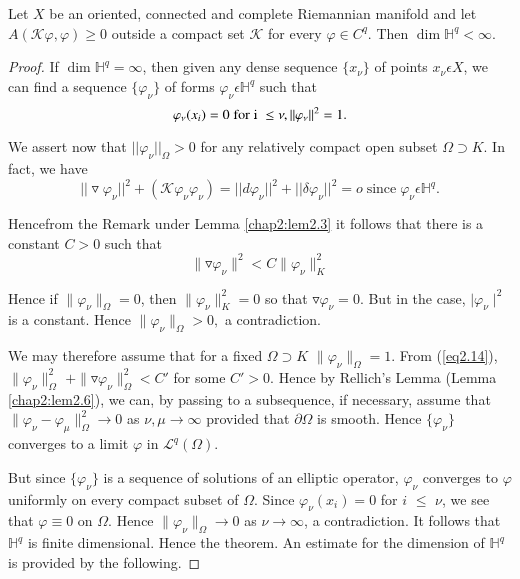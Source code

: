 \begin{theorem}\label{chap2:thm2.5}%
  Let $X$ be an oriented, connected and complete Riemannian manifold
  and let $A(\mathcal{K}\varphi,\varphi)\geq 0$ outside a compact set
  $\mathcal{K}$ for every $\varphi \in  C^q$. Then $\dim \mathbb{H}^q<\infty$. 
\end{theorem}

\begin{proof}
  If $\dim \mathbb{H}^q=\infty$, then given any dense sequence
  $\{x_\nu\}$ of points $x_\nu \epsilon X$, we can find a sequence
  $\{\varphi_\nu \}$ of forms $\varphi_\nu \epsilon \mathbb{H}^q$  
  such that 
  $$
  \varphi_\nu(x_i)=0 \; {\rm for \; i}\;\leq \nu ,
  ||\varphi_\nu||^2 = 1. 
  $$

  We assert now that $||\varphi_\nu||_\Omega > 0$ for any relatively
  compact open subset $\Omega \supset K$. In fact, we have 
  $$
  ||\triangledown \varphi_\nu||^2 + (\mathcal{K}\varphi_\nu
  \varphi_\nu)=|| d\varphi_\nu||^2 + ||\delta\varphi_\nu||^2=o\;
  \text{since}\; \varphi_\nu \epsilon \mathbb{H}^q .
  $$ 

  Hence\pageoriginale from the Remark under Lemma \ref{chap2:lem2.3}
  it follows that   there is a constant  $C > 0$ such that  
  \begin{equation*}
    \parallel \triangledown \varphi_{\nu} \parallel^2 < C \parallel
      \varphi_{\nu}\parallel^{2}_{K}  \tag{2.14}\label{eq2.14} 
  \end{equation*}

  Hence if $\parallel \varphi_\nu \parallel_\Omega = 0$, then
  $\parallel \varphi_\nu\parallel^2_K = 0$ 
  so that $\triangledown \varphi_{\nu} = 0$. But in the case, $\mid
  \varphi_\nu\mid^2$ is a constant. 
  Hence $\parallel \varphi_\nu\parallel_\Omega > 0, $ a contradiction.

  We may therefore assume that for a fixed $\Omega\supset K$
  $\parallel \varphi_\nu\parallel_\Omega = 1$. 
  From (\ref{eq2.14}),$\parallel\varphi_\nu\parallel^2_\Omega$ $+
  \parallel\triangledown\varphi_\nu\parallel^2 
  _\Omega < C'$ for some $C' > 0$. Hence by Rellich's Lemma (Lemma
  \ref{chap2:lem2.6}), we can, by passing to a subsequence,   
  if necessary, assume that $\parallel\varphi_\nu - \varphi_\mu
  \parallel^2_\Omega \rightarrow 0 $ 
  as $\nu, \mu \rightarrow \infty$ provided that $\partial\Omega$ is
  smooth. Hence  
  $\{\varphi_\nu\}$ converges to a limit $\varphi$ in  $\mathcal{L}^q(\Omega)$.

  But since $\{\varphi_\nu\}$ is a sequence of solutions of an
  elliptic operator, $\varphi_\nu$ 
  converges to $\varphi$ uniformly on every compact subset of
  $\Omega$. Since $\varphi_\nu(x_i)=0$ for $i$  
  $\leqslant$ $\nu$, we see that $\varphi \equiv 0$ on $\Omega$. Hence
  $\|\varphi_\nu \|_\Omega \rightarrow 0$ as $\nu\rightarrow\infty$, a
  contradiction. It follows that $\mathbb{H}^q$ is finite dimensional.  
  Hence the theorem. An estimate for the dimension of $\mathbb{H}^q$
  is provided by the following. 
\end{proof}

